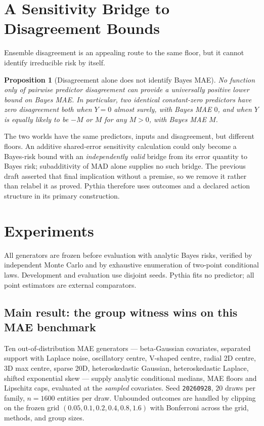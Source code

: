 \documentclass[11pt]{article}
\newtheorem{proposition}[theorem]{Proposition}
\theoremstyle{definition}
\begin{document}
\section{A Sensitivity Bridge to Disagreement Bounds}

Ensemble disagreement is an appealing route to the same floor, but it cannot identify irreducible risk by itself.

\begin{proposition}[Disagreement alone does not identify Bayes MAE]\label{prop:shared}
No function only of pairwise predictor disagreement can provide a universally positive lower bound on Bayes MAE. In particular, two identical constant-zero predictors have zero disagreement both when $Y=0$ almost surely, with Bayes MAE $0$, and when $Y$ is equally likely to be $-M$ or $M$ for any $M>0$, with Bayes MAE $M$.
\end{proposition}
The two worlds have the same predictors, inputs and disagreement, but different floors. An additive shared-error sensitivity calculation could only become a Bayes-risk bound with an \emph{independently valid} bridge from its error quantity to Bayes risk; subadditivity of MAD alone supplies no such bridge. The previous draft asserted that final implication without a premise, so we remove it rather than relabel it as proved. Pythia therefore uses outcomes and a declared action structure in its primary construction.

\section{Experiments}

All generators are frozen before evaluation with analytic Bayes risks, verified by independent Monte Carlo and by exhaustive enumeration of two-point conditional laws. Development and evaluation use disjoint seeds. Pythia fits no predictor; all point estimators are external comparators.

\subsection{Main result: the group witness wins on this MAE benchmark}\label{sec:maeexp}

Ten out-of-distribution MAE generators --- beta-Gaussian covariates, separated support with Laplace noise, oscillatory centre, V-shaped centre, radial 2D centre, 3D max centre, sparse 20D, heteroskedastic Gaussian, heteroskedastic Laplace, shifted exponential skew --- supply analytic conditional medians, MAE floors and Lipschitz caps, evaluated at the \emph{sampled} covariates. Seed \texttt{20260928}, $20$ draws per family, $n=1600$ entities per draw. Unbounded outcomes are handled by clipping on the frozen grid $(0.05,0.1,0.2,0.4,0.8,1.6)$ with Bonferroni across the grid, methods, and group sizes.
\end{document}
